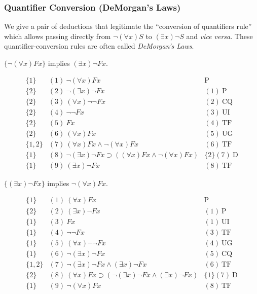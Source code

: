 \subsubsection*{Quantifier Conversion (DeMorgan's Laws)}
We give a pair of deductions that legitimate the ``conversion of quantifiers rule'' which allows passing directly from $\neg(\forall x)S$ to $(\exists x)\neg S$ and \emph{vice versa}. These quantifier-conversion rules are often called \emph{DeMorgan's Laws}.
\begin{center}
$\{\neg(\forall x)Fx\}$ implies $(\exists x)\neg Fx.$
\end{center}
\[
\begin{array}{lll}
\{1\}   & (1)\  \neg(\forall x)Fx &  \mathrm{P}\\
\{2\}   & (2)\ \neg(\exists x)\neg Fx & (1) \ \mathrm{P}\\
\{2\}   & (3)\ (\forall x)\neg\neg Fx &  (2)\ \mathrm{CQ}\\
\{2\}   & (4)\ \neg\neg Fx   & (3)\ \mathrm{UI}\\
\{2\}   & (5)\ Fx   & (4)\ \mathrm{TF}\\
\{2\}   & (6)\ (\forall x)Fx  & (5)\ \mathrm{UG}\\
\{1,2\}   & (7)\ (\forall x)Fx\wedge\neg(\forall x)Fx  & (6)\ \mathrm{TF}\\
\{1\}   & (8)\ \neg(\exists x)\neg Fx\supset((\forall x)Fx\wedge\neg(\forall x)Fx)  & \{2\}(7)\ \mathrm{D}\\
\{1\}   & (9)\ (\exists x)\neg Fx  & (8)\ \mathrm{TF}
\end{array}
\]
\begin{center}
$\{(\exists x)\neg Fx\}$ implies $\neg(\forall x)Fx.$
\end{center}
\[
\begin{array}{lll}
\{1\}   & (1)\  (\forall x)Fx &  \mathrm{P}\\
\{2\}   & (2)\ (\exists x)\neg Fx & (1) \ \mathrm{P}\\
\{1\}   & (3)\ Fx &  (1)\ \mathrm{UI}\\
\{1\}   & (4)\ \neg\neg Fx   & (3)\ \mathrm{TF}\\
\{1\}   & (5)\ (\forall x)\neg\neg Fx   & (4)\ \mathrm{UG}\\
\{1\}   & (6)\ \neg(\exists x)\neg Fx  & (5)\ \mathrm{CQ}\\
\{1,2\}   & (7)\ \neg(\exists x)\neg Fx\wedge(\exists x)\neg Fx  & (6)\ \mathrm{TF}\\
\{2\}   & (8)\ (\forall x)Fx\supset(\neg(\exists x)\neg Fx\wedge(\exists x)\neg Fx)  & \{1\}(7)\ \mathrm{D}\\
\{1\}   & (9)\ \neg(\forall x)Fx  & (8)\ \mathrm{TF}
\end{array}
\]

